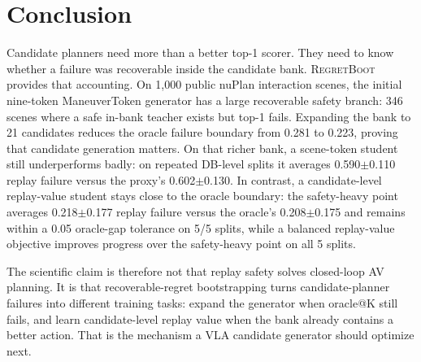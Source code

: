 \documentclass{article}
\newcommand{\method}{\textsc{RegretBoot}}
\begin{document}
\section{Conclusion}

Candidate planners need more than a better top-1 scorer. They need to know whether a
failure was recoverable inside the candidate bank. \method{} provides that accounting. On
1,000 public nuPlan interaction scenes, the initial nine-token ManeuverToken generator has
a large recoverable safety branch: 346 scenes where a safe in-bank teacher exists but
top-1 fails. Expanding the bank to 21 candidates reduces the oracle failure boundary from
0.281 to 0.223, proving that candidate generation matters. On that richer bank, a
scene-token student still underperforms badly: on repeated DB-level splits it averages
0.590$\pm$0.110 replay failure versus the proxy's 0.602$\pm$0.130. In contrast, a
candidate-level replay-value student stays close to the oracle boundary: the safety-heavy
point averages 0.218$\pm$0.177 replay failure versus the oracle's 0.208$\pm$0.175 and
remains within a 0.05 oracle-gap tolerance on 5/5 splits, while a balanced replay-value
objective improves progress over the safety-heavy point on all 5 splits.

The scientific claim is therefore not that replay safety solves closed-loop AV planning.
It is that recoverable-regret bootstrapping turns candidate-planner failures into
different training tasks: expand the generator when oracle@K still fails, and learn
candidate-level replay value when the bank already contains a better action. That is the
mechanism a VLA candidate generator should optimize next.



\end{document}
